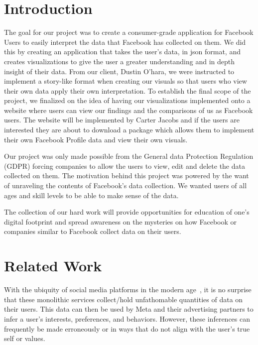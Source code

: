 \documentclass[conference, letterpaper, 11pt]{IEEEtran}
\begin{document}
\section{Introduction} \label{IN}

The goal for our project was to create a consumer-grade application for Facebook Users to easily interpret the data that Facebook has collected on them. We did this by creating an application that takes the user's data, in json format, and creates visualizations to give the user a greater understanding and in depth insight of their data. From our client, Dustin O'hara, we were instructed to implement a story-like format when creating our visuals so that users who view their own data apply their own interpretation. To establish the final scope of the project, we finalized on the idea of having our visualizations implemented onto a website where users can view our findings and the comparisons of us as Facebook users. The website will be implemented by Carter Jacobs and if the users are interested they are about to download a package which allows them to implement their own Facebook Profile data and view their own visuals. 

Our project was only made possible from the General data Protection Regulation (GDPR) forcing companies to allow the users to view, edit and delete the data collected on them. The motivation behind this project was powered by the want of unraveling the contents of Facebook's data collection. We wanted users of all ages and skill levels to be able to make sense of the data. 

The collection of our hard work will provide opportunities for education of one's digital footprint and spread awareness on the mysteries on how Facebook or companies similar to Facebook collect data on their users. 

\section{Related Work} \label{RW}

With the ubiquity of social media platforms in the modern age~\cite{metapress}, it is no surprise that these monolithic services collect/hold unfathomable quantities of data on their users. This data can then be used by Meta and their advertising partners to infer a user's interests, preferences, and behaviors. However, these inferences can frequently be made erroneously or in ways that do not align with the user's true self or values.
\end{document}
